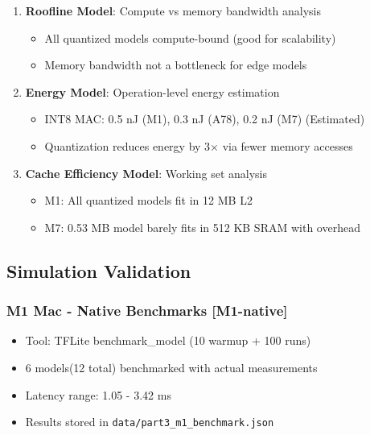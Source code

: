 \documentclass[10pt, a4paper]{article}
\begin{document}
\begin{enumerate}
    \item \textbf{Roofline Model}: Compute vs memory bandwidth analysis
    \begin{itemize}
        \item All quantized models compute-bound (good for scalability)
        \item Memory bandwidth not a bottleneck for edge models
    \end{itemize}
    
    \item \textbf{Energy Model}: Operation-level energy estimation
    \begin{itemize}
        \item INT8 MAC: 0.5 nJ (M1), 0.3 nJ (A78), 0.2 nJ (M7) (Estimated)
        \item Quantization reduces energy by 3× via fewer memory accesses
    \end{itemize}
    
    \item \textbf{Cache Efficiency Model}: Working set analysis
    \begin{itemize}
        \item M1: All quantized models fit in 12 MB L2 
        \item M7: 0.53 MB model barely fits in 512 KB SRAM with overhead
    \end{itemize}
\end{enumerate}

\subsection{Simulation Validation}

\subsubsection{M1 Mac - Native Benchmarks [M1-native]}
\begin{itemize}
    \item Tool: TFLite benchmark\_model (10 warmup + 100 runs)
    \item 6 models(12 total) benchmarked with actual measurements
    \item Latency range: 1.05 - 3.42 ms
    \item Results stored in \texttt{data/part3\_m1\_benchmark.json}
\end{itemize}
\end{document}
